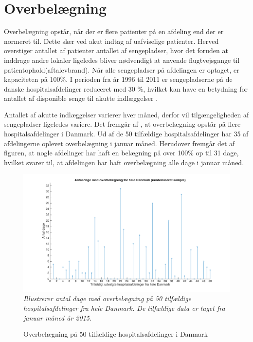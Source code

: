 \section{Overbelægning}\label{sec:overbelaegning}

Overbelægning opstår, når der er flere patienter på en afdeling end der er normeret til\cite{Heidmann2014}. Dette sker ved akut indtag af uafviselige patienter. Herved overstiger antallet af patienter antallet af sengepladser, hvor det foruden at inddrage andre lokaler ligeledes bliver nødvendigt at anvende flugtvejsgange til patientophold(aftalevbrand). Når alle sengepladser på afdelingen er optaget, er kapaciteten på 100\%. I perioden fra år 1996 til 2011 er sengepladserne på de danske hospitalsafdelinger reduceret med 30 \%, hvilket kan have en betydning for antallet af disponible senge til akutte indlæggelser \cite{Madsen2014}. 

Antallet af akutte indlæggelser varierer hver måned, derfor vil tilgængeligheden af sengepladser ligeledes variere. Det fremgår af , at overbelægning opstår på flere hospitalsafdelinger i Danmark. Ud af de 50 tilfældige hospitalsafdelinger har 35 af afdelingerne oplevet overbelægning i januar måned. Herudover fremgår det af figuren, at nogle afdelinger har haft en belægning på over 100\% op til 31 dage, hvilket svarer til, at afdelingen har haft overbelægning alle dage i januar måned. 


\begin{figure}[H]
	\flushleft 
	\caption{Overbelægning på 50 tilfældige hospitalsafdelinger i Danmark}
	\centering
	\includegraphics[scale=.3]{figures/overbelaegning_ran}
	\label{ig:overbelaegning_ran}
	\flushleft
	\textit{Illustrerer antal dage med overbelægning på 50 tilfældige hospitalsafdelinger fra hele Danmark. De tilfældige data er taget fra januar måned år 2015. \cite{SDS2015}}
\end{figure}




